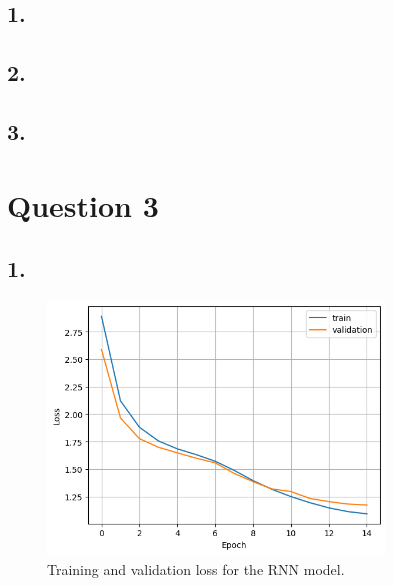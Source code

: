 \documentclass[11pt]{article}
\begin{document}
\subsection{1.}
\subsection{2.}
\subsection{3.}
\section{Question 3}
\subsection{1.}
\begin{figure}[H]
    \centering
    \includegraphics[width=0.8\textwidth]{./plots/recurrent_loss_per_epoch}
    \caption{Training and validation loss for the RNN model.}
    \label{fig:recurrent_loss_per_epoch}
\end{figure}
\end{document}

